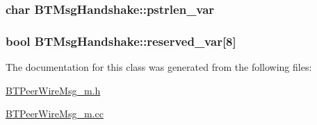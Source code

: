 \subsubsection[{pstrlen\+\_\+var}]{\setlength{\rightskip}{0pt plus 5cm}char B\+T\+Msg\+Handshake\+::pstrlen\+\_\+var\hspace{0.3cm}{\ttfamily [protected]}}\label{classBTMsgHandshake_aac6817b686487e3646ff1ec8ffe28965}
\hypertarget{classBTMsgHandshake_a289f010d689e2d2649e1585c6eb8a683}{}
\subsubsection[{reserved\+\_\+var}]{\setlength{\rightskip}{0pt plus 5cm}bool B\+T\+Msg\+Handshake\+::reserved\+\_\+var\mbox{[}8\mbox{]}\hspace{0.3cm}{\ttfamily [protected]}}\label{classBTMsgHandshake_a289f010d689e2d2649e1585c6eb8a683}


The documentation for this class was generated from the following files\+:\begin{DoxyCompactItemize}
\item 
\hyperlink{BTPeerWireMsg__m_8h}{B\+T\+Peer\+Wire\+Msg\+\_\+m.\+h}\item 
\hyperlink{BTPeerWireMsg__m_8cc}{B\+T\+Peer\+Wire\+Msg\+\_\+m.\+cc}\end{DoxyCompactItemize}
